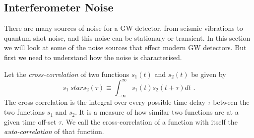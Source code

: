 \documentclass[11pt]{cuthesis}
\newcommand{\fs}{\text{ .}}
\newcommand{\infint}{\int^\infty_{-\infty} }
\begin{document}
\subsection{Interferometer Noise}
There are many sources of noise for a GW detector, from seismic vibrations to quantum shot noise, and this noise can be stationary or transient. In this section we will look at some of the noise sources that effect modern GW detectors. But first we need to understand how the noise is characterised. 

Let the \textit{cross-correlation} of two functions $s_1(t)$ and $s_2(t)$ be given by
\begin{equation}
s_1 \ star s_2 (\tau) \equiv \infint s_1(t) s_2 (t+\tau)dt \fs
\end{equation}
The cross-correlation is the integral over every possible time delay $\tau$ between the two functions $s_1$ and $s_2$. It is a measure of how similar two functions are at a given time off-set $\tau$. We call the cross-correlation of a function with itself the \textit{auto-correlation} of that function.
\end{document}
